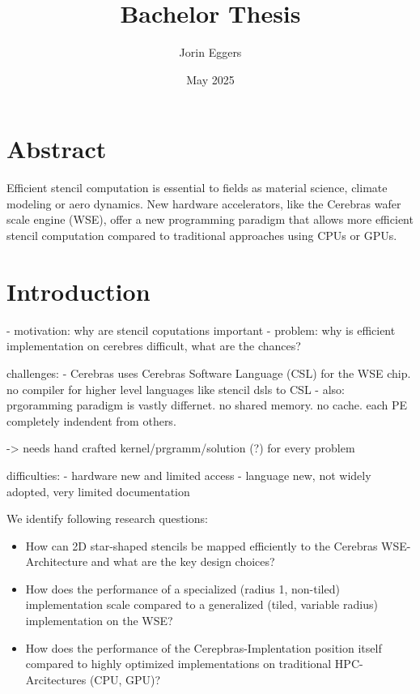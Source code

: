 \documentclass{article}
\title{Bachelor Thesis}
\author{Jorin Eggers }
\date{May 2025}
\begin{document}
\maketitle

\section*{Abstract}
Efficient stencil computation is essential to fields as material science, climate modeling or aero dynamics. New hardware accelerators, like the Cerebras wafer scale engine (WSE), offer a new programming paradigm that allows more efficient stencil computation compared to traditional approaches using CPUs or GPUs.


\section{Introduction}
- motivation: why are stencil coputations important 
- problem: why is efficient implementation on cerebres difficult, what are the chances?

challenges:
- Cerebras uses Cerebras Software Language (CSL) for the WSE chip. no compiler for higher level languages like stencil dsls to CSL
- also: prgoramming paradigm is vastly differnet. no shared memory. no cache. each PE completely indendent from others.

-> needs hand crafted kernel/prgramm/solution (?) for every problem

difficulties:
- hardware new and limited access
- language new, not widely adopted, very limited documentation

We identify following research questions:
\begin{itemize}
    \item How can 2D star-shaped stencils be mapped efficiently to the Cerebras WSE-Architecture and what are the key design choices?
    \item How does the performance of a specialized (radius 1, non-tiled) implementation scale compared to a generalized (tiled, variable radius) implementation on the WSE?
    \item How does the performance of the Cerepbras-Implentation position itself compared to highly optimized implementations on traditional HPC-Arcitectures (CPU, GPU)? 
\end{itemize}
\end{document}
